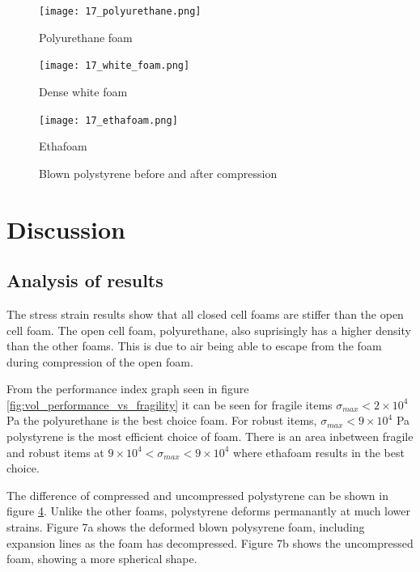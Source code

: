 \documentclass{article}
\begin{document}
\begin{figure}[H]
\centering
\texttt{[image: 17\_polyurethane.png]}
\caption{\label{fig:polyurethane} Polyurethane foam}
\end{figure}

\begin{figure}[H]
\centering
\texttt{[image: 17\_white\_foam.png]}
\caption{\label{fig:white_foam} Dense white foam}
\end{figure}

\begin{figure}[H]
\centering
\texttt{[image: 17\_ethafoam.png]}
\caption{\label{fig:ethafoam} Ethafoam}
\end{figure}

\begin{figure}[H]
\centering
{}%
\qquad
{}%
\caption{\label{fig:polystyrene} Blown polystyrene before and after compression}
\end{figure}

\section{Discussion}

\subsection{Analysis of results}

The stress strain results show that all closed cell foams are stiffer than the open cell foam.
The open cell foam, polyurethane, also suprisingly has a higher density than the other foams.
This is due to air being able to escape from the foam during compression of the open foam.

From the performance index graph seen in figure \ref{fig:vol_performance_vs_fragility} it can be seen for fragile items $\sigma_{max} < 2\times 10^4 $ Pa the polyurethane is the best choice foam.
For robust items, $ \sigma_{max} < 9\times 10^4 $ Pa polystyrene is the most efficient choice of foam.
There is an area inbetween fragile and robust items at $ 9\times 10^4 < \sigma_{max} < 9\times 10^4 $ where ethafoam results in the best choice.

The difference of compressed and uncompressed polystyrene can be shown in figure \ref{fig:polystyrene}.
Unlike the other foams, polystyrene deforms permanantly at much lower strains.
Figure 7a shows the deformed blown polysyrene foam, including expansion lines as the 
foam has decompressed. Figure 7b shows the uncompressed foam, showing a more spherical shape.
\end{document}
